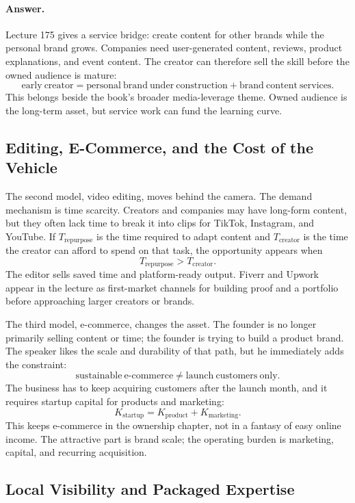 \documentclass[11pt,oneside]{book}
\begin{document}
\paragraph{Answer.}
Lecture 175 gives a service bridge: create content for other brands while the personal brand grows. Companies need user-generated content, reviews, product explanations, and event content. The creator can therefore sell the skill before the owned audience is mature:
\[
\mathrm{early\ creator}
=
\mathrm{personal\ brand\ under\ construction}
+
\mathrm{brand\ content\ services}.
\]
This belongs beside the book's broader media-leverage theme. Owned audience is the long-term asset, but service work can fund the learning curve.

\subsection{Editing, E-Commerce, and the Cost of the Vehicle}

The second model, video editing, moves behind the camera. The demand mechanism is time scarcity. Creators and companies may have long-form content, but they often lack time to break it into clips for TikTok, Instagram, and YouTube. If \(T_{\mathrm{repurpose}}\) is the time required to adapt content and \(T_{\mathrm{creator}}\) is the time the creator can afford to spend on that task, the opportunity appears when
\[
T_{\mathrm{repurpose}}>T_{\mathrm{creator}}.
\]
The editor sells saved time and platform-ready output. Fiverr and Upwork appear in the lecture as first-market channels for building proof and a portfolio before approaching larger creators or brands.

The third model, e-commerce, changes the asset. The founder is no longer primarily selling content or time; the founder is trying to build a product brand. The speaker likes the scale and durability of that path, but he immediately adds the constraint:
\[
\mathrm{sustainable\ e\mbox{-}commerce}
\neq
\mathrm{launch\ customers\ only}.
\]
The business has to keep acquiring customers after the launch month, and it requires startup capital for products and marketing:
\[
K_{\mathrm{startup}}
=
K_{\mathrm{product}}
+
K_{\mathrm{marketing}}.
\]
This keeps e-commerce in the ownership chapter, not in a fantasy of easy online income. The attractive part is brand scale; the operating burden is marketing, capital, and recurring acquisition.

\subsection{Local Visibility and Packaged Expertise}
\end{document}
